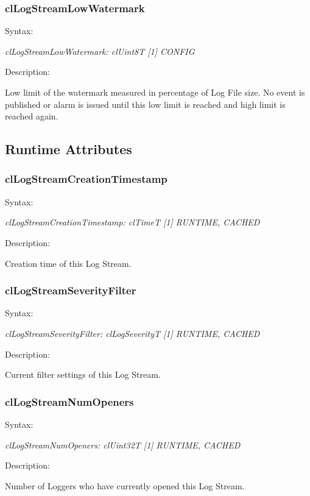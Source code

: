 \begin{flushleft}
\subsubsection{clLogStreamLowWatermark}
\begin{Desc}
\item[Syntax:]
\end{Desc}
\textit{clLogStreamLowWatermark: clUint8T [1] {CONFIG}}
\begin{Desc}
 \item[Description:]
\end{Desc}
Low limit of the watermark measured in percentage of Log File size. No event
is published or alarm is issued until this low limit is reached and high limit is reached again.



\subsection{Runtime Attributes}
\subsubsection{clLogStreamCreationTimestamp}
\begin{Desc}
\item[Syntax:]
\end{Desc}
\textit{clLogStreamCreationTimestamp: clTimeT [1] {RUNTIME, CACHED}}
\begin{Desc}
 \item[Description:]
\end{Desc}
Creation time of this Log Stream.

\subsubsection{clLogStreamSeverityFilter}
\begin{Desc}
\item[Syntax:]
\end{Desc}
\textit{clLogStreamSeverityFilter: clLogSeverityT [1] {RUNTIME, CACHED}}
\begin{Desc}
 \item[Description:]
\end{Desc}
Current filter settings of this Log Stream.

\subsubsection{clLogStreamNumOpeners}
\begin{Desc}
\item[Syntax:]
\end{Desc}
\textit{clLogStreamNumOpeners: clUint32T [1] {RUNTIME, CACHED}}
\begin{Desc}
 \item[Description:]
\end{Desc}
Number of Loggers who have currently opened this Log Stream.



\end{flushleft}
